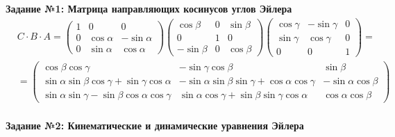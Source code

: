 \documentclass[a4paper, 12pt]{article}%
\begin{document}
	
\textbf{Задание №1: Матрица направляющих косинусов углов Эйлера}\\ 

	\begin{eqnarray*}
	 &C \cdot B \cdot A = \left(\begin{array}{ccc}1 & 0 & 0 \\ 0 & \cos \alpha & -\sin \alpha \\ 0 & \sin \alpha & \cos \alpha\end{array}\right)\left(\begin{array}{ccc}\cos \beta & 0 & \sin \beta \\ 0 & 1 & 0 \\ -\sin \beta & 0 & \cos \beta\end{array}\right)\left(\begin{array}{ccc}\cos \gamma & -\sin \gamma & 0 \\ \sin \gamma & \cos \gamma & 0 \\ 0 & 0 & 1\end{array}\right) =   &\\ &=\left(\begin{array}{ccc}\cos \beta \cos \gamma & -\sin \gamma \cos \beta & \sin \beta \\ \sin \alpha \sin \beta \cos \gamma+\sin \gamma \cos \alpha & -\sin \alpha \sin \beta \sin \gamma+\cos \alpha \cos \gamma & -\sin \alpha \cos \beta \\ \sin \alpha \sin \gamma-\sin \beta \cos \alpha \cos \gamma & \sin \alpha \cos \gamma+\sin \beta \sin \gamma \cos \alpha & \cos \alpha \cos \beta\end{array}\right) &
	\end{eqnarray*} \\
	
	
	\textbf{Задание №2: Кинематические и динамические уравнения Эйлера }\\ 
	
\end{document}
